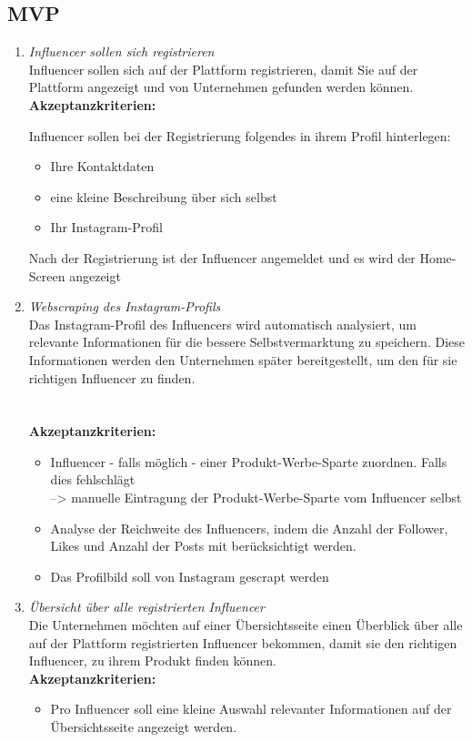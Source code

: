\documentclass[conference,a4paper,flushend]{cs-techrep}
\begin{document}
\subsection{MVP}
\begin{enumerate}
\item{\textit{Influencer sollen sich registrieren}\\
 Influencer sollen sich auf der Plattform registrieren, damit Sie auf der Plattform angezeigt und von Unternehmen gefunden werden können.\\
 \textbf{Akzeptanzkriterien:}

Influencer sollen bei der Registrierung folgendes in ihrem Profil hinterlegen:
\begin{itemize}
\item{Ihre Kontaktdaten}
\item{eine kleine Beschreibung über sich selbst}
\item{Ihr Instagram-Profil}
\end{itemize}
Nach der Registrierung ist der Influencer angemeldet und es wird der Home-Screen angezeigt\\}



\item{\textit{Webscraping des Instagram-Profils}\\
Das Instagram-Profil des Influencers wird automatisch analysiert, um relevante Informationen für die bessere Selbstvermarktung zu speichern. Diese Informationen werden den Unternehmen später bereitgestellt, um den für sie richtigen Influencer zu finden. \\
\\
\\
\textbf{Akzeptanzkriterien:}
\begin{itemize}
\item{Influencer - falls möglich - einer Produkt-Werbe-Sparte zuordnen. Falls dies fehlschlägt\\
--> manuelle Eintragung der Produkt-Werbe-Sparte vom Influencer selbst}
\item{Analyse der Reichweite des Influencers, indem die Anzahl der Follower, Likes und Anzahl der Posts mit berücksichtigt werden.}
\item{Das Profilbild soll von Instagram gescrapt werden\\}
\end{itemize}}

\item{\textit{Übersicht über alle registrierten Influencer}\\
Die Unternehmen möchten auf einer Übersichtsseite einen Überblick über alle auf der Plattform registrierten Influencer bekommen, damit sie den richtigen Influencer, zu ihrem Produkt finden können. \\
 \textbf{Akzeptanzkriterien:}
\begin{itemize}
\item{Pro Influencer soll eine kleine Auswahl relevanter Informationen auf der Übersichtsseite angezeigt werden.}


\end{itemize}}
\end{enumerate}
\end{document}
